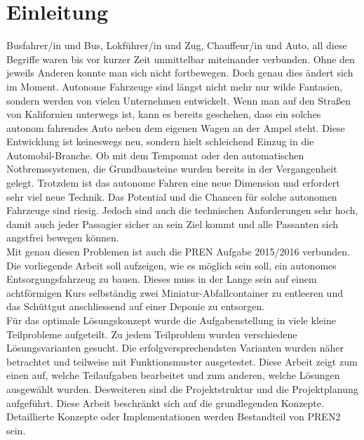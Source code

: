 \section{Einleitung}
Busfahrer/in und Bus, Lokführer/in und Zug, Chauffeur/in und Auto, all diese Begriffe waren bis vor kurzer Zeit unmittelbar miteinander verbunden. Ohne den jeweils Anderen konnte man sich nicht fortbewegen. Doch genau dies ändert sich im Moment. Autonome Fahrzeuge sind längst nicht mehr nur wilde Fantasien, sondern werden von vielen Unternehmen entwickelt. Wenn man auf den Straßen von Kalifornien unterwegs ist, kann es bereits geschehen, dass ein solches autonom fahrendes Auto neben dem eigenen Wagen an der Ampel steht. Diese Entwicklung ist keineswegs neu, sondern hielt schleichend Einzug in die Automobil-Branche. Ob mit dem Tempomat oder den automatischen Notbremssystemen, die Grundbausteine wurden bereits in der Vergangenheit gelegt.
Trotzdem ist das autonome Fahren eine neue Dimension und erfordert sehr viel neue Technik. Das Potential und die Chancen für solche autonomen Fahrzeuge sind riesig. Jedoch sind auch die technischen Anforderungen sehr hoch, damit auch jeder Passagier sicher an sein Ziel kommt und alle Passanten sich angstfrei bewegen können. \\
Mit genau diesen Problemen ist auch die PREN Aufgabe 2015/2016 verbunden. Die vorliegende Arbeit soll aufzeigen, wie es möglich sein soll, ein autonomes Entsorgungsfahrzeug zu bauen. Dieses muss in der Lange sein auf einem achtförmigen Kurs selbständig zwei Miniatur-Abfallcontainer zu entleeren und das Schüttgut anschliessend auf einer Deponie zu entsorgen.\\
Für das optimale Lösungskonzept wurde die Aufgabenstellung in viele kleine Teilprobleme aufgeteilt. Zu jedem Teilproblem wurden verschiedene Lösungsvarianten gesucht. Die erfolgversprechendsten Varianten wurden näher betrachtet und teilweise mit Funktionsmuster ausgetestet. Diese Arbeit zeigt zum einen auf, welche Teilaufgaben bearbeitet und zum anderen, welche Lösungen ausgewählt wurden. Desweiteren sind die Projektstruktur und die Projektplanung aufgeführt. Diese Arbeit beschränkt sich auf die grundlegenden Konzepte. Detaillierte Konzepte oder Implementationen werden Bestandteil von PREN2 sein. 

\newpage